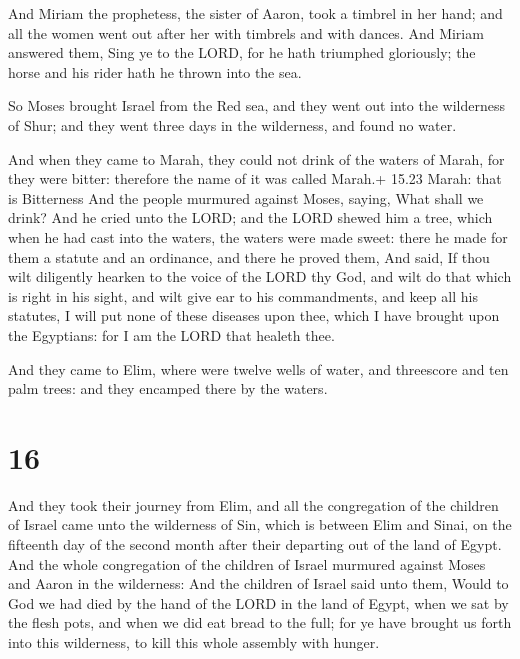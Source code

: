  And Miriam the prophetess, the sister of Aaron, took a
timbrel in her hand; and all the women went out after her with timbrels
and with dances.  And Miriam answered them, Sing ye to the
LORD, for he hath triumphed gloriously; the horse and his rider hath he
thrown into the sea.

 So Moses brought Israel from the Red sea, and they went
out into the wilderness of Shur; and they went three days in the
wilderness, and found no water.

 And when they came to Marah, they could not drink of the
waters of Marah, for they were bitter: therefore the name of it was
called Marah.+ 15.23 Marah: that is Bitterness  And the
people murmured against Moses, saying, What shall we drink?
 And he cried unto the LORD; and the LORD shewed him a
tree, which when he had cast into the waters, the waters were made
sweet: there he made for them a statute and an ordinance, and there he
proved them,  And said, If thou wilt diligently hearken to
the voice of the LORD thy God, and wilt do that which is right in his
sight, and wilt give ear to his commandments, and keep all his statutes,
I will put none of these diseases upon thee, which I have brought upon
the Egyptians: for I am the LORD that healeth thee.

 And they came to Elim, where were twelve wells of water,
and threescore and ten palm trees: and they encamped there by the
waters.

\hypertarget{section-15}{%
\section{16}\label{section-15}}

 And they took their journey from Elim, and all the
congregation of the children of Israel came unto the wilderness of Sin,
which is between Elim and Sinai, on the fifteenth day of the second
month after their departing out of the land of Egypt.  And
the whole congregation of the children of Israel murmured against Moses
and Aaron in the wilderness:  And the children of Israel
said unto them, Would to God we had died by the hand of the LORD in the
land of Egypt, when we sat by the flesh pots, and when we did eat bread
to the full; for ye have brought us forth into this wilderness, to kill
this whole assembly with hunger.

